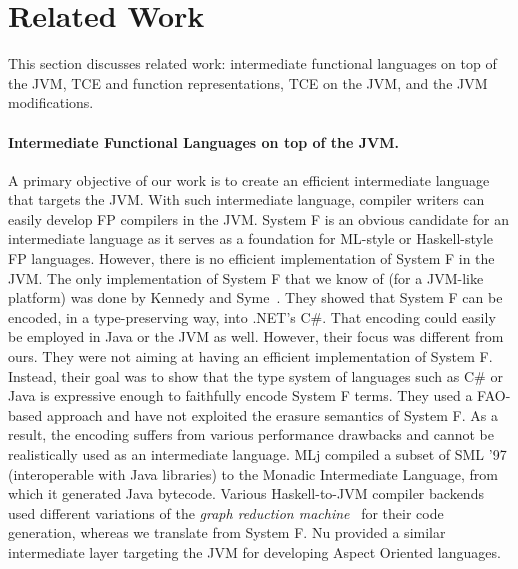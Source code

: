 \section{Related Work}

This section discusses related work: intermediate functional languages on top of the JVM,
TCE and function representations, TCE on the JVM, and the JVM modifications.

\paragraph{Intermediate Functional Languages on top of the JVM.}
A primary objective of our work is to create an efficient intermediate
language that targets the JVM. With such intermediate language,
compiler writers can easily develop FP compilers in the JVM.
System F is an obvious candidate for an intermediate language as it
serves as a foundation for ML-style or Haskell-style FP languages.
However, there is no efficient implementation of System F in the JVM.
The only implementation of System F that we know of (for a JVM-like
platform) was done by Kennedy and Syme~\cite{Kennedy2004}. They showed
that System F can be encoded, in a type-preserving way, into
.NET's C\#. That encoding could easily be employed in Java or the JVM as
well. However, their focus was different from ours. They were not aiming
at having an efficient implementation of System F. Instead, their goal
was to show that the type system of languages such as C\# or Java is
expressive enough to faithfully encode System F terms. They used a
FAO-based approach and have not exploited the erasure semantics of System F.
As a result, the encoding suffers from various performance drawbacks
and cannot be realistically used as an intermediate language. MLj
\cite{Benton1998} compiled a subset of SML '97 (interoperable with
Java libraries) to the Monadic Intermediate Language, from which it
generated Java bytecode. Various Haskell-to-JVM compiler backends
\cite{Wakeling1999,Tullsen1996,Choi2001} used different
variations of the \emph{graph reduction machine}~\cite{Wadsworth:1971} for their
code generation, whereas we translate from System F.  Nu \cite{Dyer2008}
provided a similar intermediate layer targeting the JVM for developing
Aspect Oriented languages.

